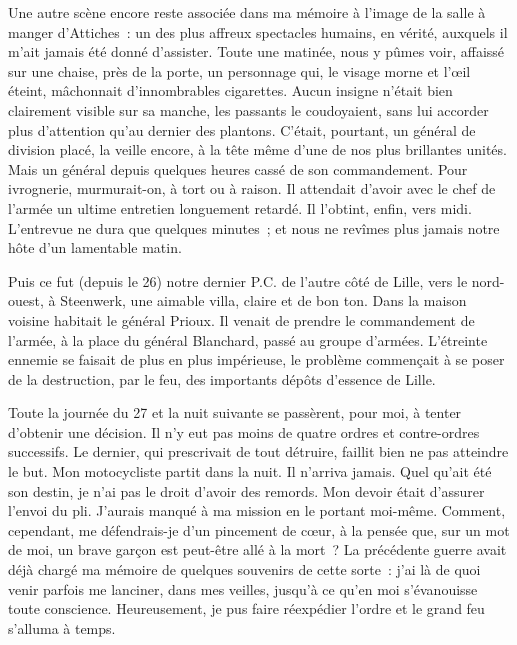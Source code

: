 \documentclass[french,twoside]{book} %
\begin{document}
Une autre scène encore reste associée dans ma mémoire à l’image de la salle à manger d’Attiches : un des plus affreux spectacles humains, en vérité, auxquels il m’ait jamais été donné d’assister. Toute une matinée, nous y pûmes voir, affaissé sur une chaise, près de la porte, un personnage qui, le visage morne et l’œil éteint, mâchonnait d’innombrables cigarettes. Aucun insigne n’était bien clairement visible sur sa manche, les passants le coudoyaient,   sans lui accorder plus d’attention qu’au dernier des plantons. C’était, pourtant, un général de division placé, la veille encore, à la tête même d’une de nos plus brillantes unités. Mais un général depuis quelques heures cassé de son commandement. Pour ivrognerie, murmurait-on, à tort ou à raison. Il attendait d’avoir avec le chef de l’armée un ultime entretien longuement retardé. Il l’obtint, enfin, vers midi. L’entrevue ne dura que quelques minutes ; et nous ne revîmes plus jamais notre hôte d’un lamentable matin.\par
Puis ce fut (depuis le 26) notre dernier P.C. de l’autre côté de Lille, vers le nord-ouest, à Steenwerk, une aimable villa, claire et de bon ton. Dans la maison voisine habitait le général Prioux. Il venait de prendre le commandement de l’armée, à la place du général Blanchard, passé au groupe d’armées. L’étreinte ennemie se faisait de plus en plus impérieuse, le problème commençait à se poser de la destruction, par le feu, des importants dépôts d’essence de Lille.\par
Toute la journée du 27 et la nuit suivante se passèrent, pour moi, à tenter d’obtenir une décision. Il n’y eut pas moins de quatre ordres et contre-ordres successifs. Le dernier, qui prescrivait de tout détruire, faillit bien ne pas atteindre le but. Mon motocycliste partit dans la nuit. Il n’arriva jamais. Quel qu’ait été son destin, je n’ai pas le droit d’avoir des remords. Mon devoir était d’assurer l’envoi du pli. J’aurais manqué à ma mission en le portant moi-même. Comment, cependant, me défendrais-je d’un pincement de cœur, à la pensée que, sur un mot de moi, un brave garçon est peut-être allé à la mort ? La précédente guerre avait déjà chargé ma mémoire de quelques souvenirs de cette sorte : j’ai là de quoi venir parfois me lanciner, dans mes veilles, jusqu’à ce qu’en moi s’évanouisse toute conscience. Heureusement, je pus faire réexpédier l’ordre et le grand feu s’alluma à temps.\par
\end{document}
